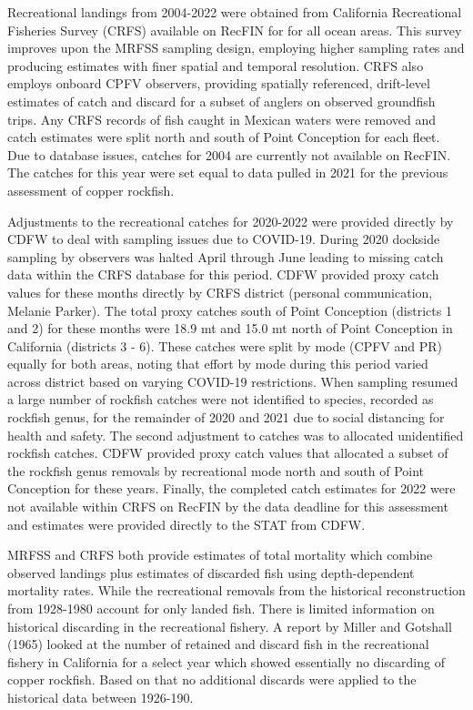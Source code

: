 \documentclass[11pt,
  english,
  letterpaper,
]{article}
\begin{document}
Recreational landings from 2004-2022 were obtained from California Recreational Fisheries Survey (CRFS) available on RecFIN for for all ocean areas. This survey improves upon the MRFSS sampling design, employing higher sampling rates and producing estimates with finer spatial and temporal resolution. CRFS also employs onboard CPFV observers, providing spatially referenced, drift-level estimates of catch and discard for a subset of anglers on observed groundfish trips. Any CRFS records of fish caught in Mexican waters were removed and catch estimates were split north and south of Point Conception for each fleet. Due to database issues, catches for 2004 are currently not available on RecFIN. The catches for this year were set equal to data pulled in 2021 for the previous assessment of copper rockfish.

Adjustments to the recreational catches for 2020-2022 were provided directly by CDFW to deal with sampling issues due to COVID-19. During 2020 dockside sampling by observers was halted April through June leading to missing catch data within the CRFS database for this period. CDFW provided proxy catch values for these months directly by CRFS district (personal communication, Melanie Parker). The total proxy catches south of Point Conception (districts 1 and 2) for these months were 18.9 mt and 15.0 mt north of Point Conception in California (districts 3 - 6). These catches were split by mode (CPFV and PR) equally for both areas, noting that effort by mode during this period varied across district based on varying COVID-19 restrictions. When sampling resumed a large number of rockfish catches were not identified to species, recorded as rockfish genus, for the remainder of 2020 and 2021 due to social distancing for health and safety. The second adjustment to catches was to allocated unidentified rockfish catches. CDFW provided proxy catch values that allocated a subset of the rockfish genus removals by recreational mode north and south of Point Conception for these years. Finally, the completed catch estimates for 2022 were not available within CRFS on RecFIN by the data deadline for this assessment and estimates were provided directly to the STAT from CDFW.

MRFSS and CRFS both provide estimates of total mortality which combine observed landings plus estimates of discarded fish using depth-dependent mortality rates. While the recreational removals from the historical reconstruction from 1928-1980 account for only landed fish. There is limited information on historical discarding in the recreational fishery. A report by Miller and Gotshall (1965) looked at the number of retained and discard fish in the recreational fishery in California for a select year which showed essentially no discarding of copper rockfish. Based on that no additional discards were applied to the historical data between 1926-190.
\end{document}
